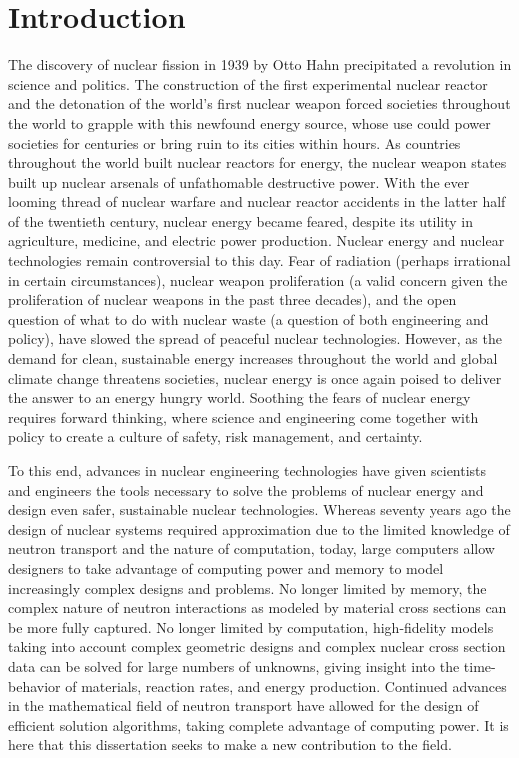 \chapter{Introduction}

The discovery of nuclear fission in 1939 by Otto Hahn precipitated a revolution in science and politics. The construction of the first experimental nuclear reactor and the detonation of the world's first nuclear weapon forced societies throughout the world to grapple with this newfound energy source, whose use could power societies for centuries or bring ruin to its cities within hours. As countries throughout the world built nuclear reactors for energy, the nuclear weapon states built up nuclear arsenals of unfathomable destructive power. With the ever looming thread of nuclear warfare and nuclear reactor accidents in the latter half of the twentieth century, nuclear energy became feared, despite its utility in agriculture, medicine, and electric power production.  Nuclear energy and nuclear technologies remain controversial to this day. Fear of radiation (perhaps irrational in certain circumstances), nuclear weapon proliferation (a valid concern given the proliferation of nuclear weapons in the past three decades), and the open question of what to do with nuclear waste (a question of both engineering and policy), have slowed the spread of peaceful nuclear technologies. However, as the demand for clean, sustainable energy increases throughout the world and global climate change threatens societies, nuclear energy is once again poised to deliver the answer to an energy hungry world. Soothing the fears of nuclear energy requires forward thinking, where science and engineering come together with policy to create a culture of safety, risk management, and certainty. 

To this end, advances in nuclear engineering technologies have given scientists and engineers the tools necessary to solve the problems of nuclear energy and design even safer, sustainable nuclear technologies. Whereas seventy years ago the design of nuclear systems required approximation due to the limited knowledge of neutron transport and the nature of computation, today, large computers allow designers to take advantage of computing power and memory to model increasingly complex designs and problems. No longer limited by memory, the complex nature of neutron interactions as modeled by material cross sections can be more fully captured. No longer limited by computation, high-fidelity models taking into account complex geometric designs and complex nuclear cross section data can be solved for large numbers of unknowns, giving insight into the time-behavior of materials, reaction rates, and energy production. Continued advances in the mathematical field of neutron transport have allowed for the design of efficient solution algorithms, taking complete advantage of computing power. It is here that this dissertation seeks to make a new contribution to the field. 

